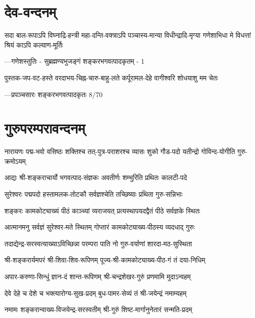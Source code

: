 
\newcommand{\creditline}[1]{\nobreak\hfill{—\normalsize #1}}

\section{देव-वन्दनम्}

\twolineshloka
{सदा बाल-रूपाऽपि विघ्नाद्रि-हन्त्री महा-दन्ति-वक्त्राऽपि पञ्चास्य-मान्या}
{विधीन्द्रादि-मृग्या गणेशाभिधा मे विधत्तां श्रियं काऽपि कल्याण-मूर्तिः}

\creditline{गणेशस्तुतिः - सुब्रह्मण्यभुजङ्गं शङ्करभगवत्पादकृतम् - 1}

\twolineshloka
{पुस्तक-जप-वट-हस्ते वरदाभय-चिह्न-चारु-बाहु-लते}
{कर्पूरामल-देहे वागीश्वरि शोधयाशु मम चेतः}

\creditline{प्रपञ्चसारः शङ्करभगवत्पादकृतः 8/70}

\section{गुरुपरम्परावन्दनम्}

\twolineshloka
{नारायणः पद्म-भवो वसिष्ठः शक्तिश्च तत्-पुत्र-पराशरश्च}
{व्यासः शुको गौड-पदो यतीन्द्रो गोविन्द-योगीति गुरु-क्रमोऽयम्}

\twolineshloka
{आद्यः श्री-शङ्कराचार्यो भगवत्पाद-संज्ञकः}
{अवतीर्णः शम्भुरिति प्रथितः कालटी-पदे}

\twolineshloka
{सुरेश्वरः पद्मपदो हस्तामलक-तोटकौ}
{सर्वज्ञश्चेति तच्छिष्याः प्रथिता गुरु-सन्निभाः}

\twolineshloka
{शङ्करः कामकोट्याख्यं पीठं काञ्च्यां व्यराजयत्}
{प्रत्यस्थापयदद्वैतं पीठे सर्वज्ञके स्थितः}

\twolineshloka
{आत्मानमनु सर्वज्ञं सुरेश्वर-मते स्थितम्}
{गोप्तारं कामकोट्याख्य-पीठस्य व्यदधाद् गुरुः}

\twolineshloka
{तदाद्येन्द्र-सरस्वत्याख्याऽविच्छिन्ना परम्परा}
{पाति नो गुरु-वर्याणां शारदा-मठ-सुस्थिता}

\twolineshloka
{श्री-शङ्करार्यमपरं श्री-शिवा-शिव-रूपिणम्}
{पूज्य-श्री-कामकोट्याख्य-पीठ-गं तं दया-निधिम्}

\twolineshloka
{अपार-करुणा-सिन्धुं ज्ञान-दं शान्त-रूपिणम्}
{श्री-चन्द्रशेखर-गुरुं प्रणमामि मुदाऽन्वहम्}

\twolineshloka
{देवे देहे च देशे च भक्त्यारोग्य-सुख-प्रदम्}
{बुध-पामर-सेव्यं तं श्री-जयेन्द्रं नमाम्यहम्}

\twolineshloka
{नमामः शङ्करान्वाख्य-विजयेन्द्र-सरस्वतीम्}
{श्री-गुरुं शिष्ट-मार्गानुनेतारं सन्मति-प्रदम्}


